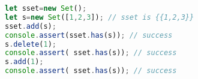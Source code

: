 \begin{lstlisting}[language=Javascript]
let sset=new Set();                                                           
let s=new Set([1,2,3]); // sset is {{1,2,3}}                                                         
sset.add(s);
console.assert(sset.has(s)); // success
s.delete(1);
console.assert( sset.has(s)); // success
s.add(1);
console.assert( sset.has(s)); // success
\end{lstlisting}




